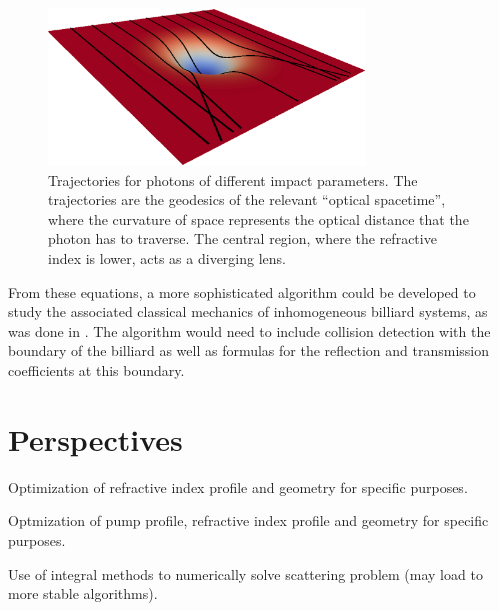 \begin{figure}
 \centering
 \includegraphics[width=0.75\textwidth]{figs/passive/geodesics-1.eps}
 \caption[Photon trajectories in a Gaussian deformation of the refractive index]
	  {Trajectories for photons of different impact parameters. The trajectories are
	  the geodesics of the relevant ``optical spacetime'', where the curvature of 
	  space represents the optical distance that the photon has to traverse. The central
	  region, where the refractive index is lower, acts as a diverging lens.}
 \label{fig:passive.gaussian.geodesics}
\end{figure}

From these equations, a more sophisticated algorithm could be developed to study
the associated classical mechanics of inhomogeneous billiard systems, as was done
in \cite{SAI2005}. The algorithm would need to include collision detection with the 
boundary of the billiard as well as formulas for the reflection and transmission coefficients
at this boundary.

\section{Perspectives}

Optimization of refractive index profile and geometry
for specific purposes. 

Optmization of pump profile, refractive index profile
and geometry for specific purposes. 

Use of integral methods to numerically solve scattering
problem (may load to more stable algorithms). 

